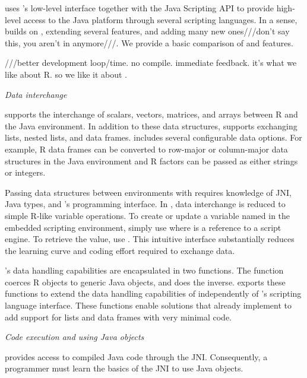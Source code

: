  uses 's low-level interface together with the Java Scripting API to provide high-level access to the Java platform through several scripting languages. In a sense,  builds on , extending several features, and adding many new ones///don't say this, you aren't in  anymore///. We provide a basic comparison of  and  features.

///better development loop/time. no compile. immediate feedback. it's what we like about R. so we like it about .

\noindent \textit{Data interchange}

\noindent {} supports the interchange of scalars, vectors, matrices, and arrays between R and the Java environment. In addition to these data structures,  supports exchanging lists, nested lists, and data frames.  includes several configurable data options. For example, R data frames can be converted to row-major or column-major data structures in the Java environment and R factors can be passed as either strings or integers.

Passing data structures between environments with  requires knowledge of JNI, Java types, and 's programming interface. In , data interchange is reduced to simple R-like variable operations. To create or update a variable named  in the embedded scripting environment, simply use  where  is a  reference to a script engine. To retrieve the value, use . This intuitive interface substantially reduces the learning curve and coding effort required to exchange data.

's data handling capabilities are encapsulated in two functions. The function  coerces R objects to generic Java objects, and  does the inverse.  exports these functions to extend the data handling capabilities of  independently of 's scripting language interface. These functions enable solutions that already implement  to add support for lists and data frames with very minimal code.

\noindent \textit{Code execution and using Java objects}

\noindent {} provides access to compiled Java code through the JNI. Consequently, a programmer must learn the basics of the JNI to use Java objects. 

